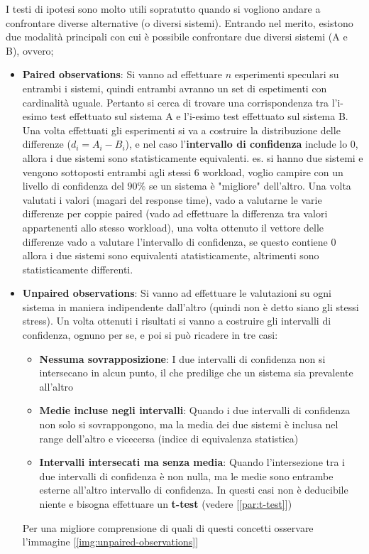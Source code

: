 I testi di ipotesi sono molto utili sopratutto quando si vogliono andare a confrontare diverse alternative (o diversi sistemi). Entrando nel merito, esistono due modalità principali con cui è possibile confrontare due diversi sistemi (A e B), ovvero;
\begin{itemize}
    \item \textbf{Paired observations}: Si vanno ad effettuare \(n\) esperimenti speculari su entrambi i sistemi, quindi entrambi avranno un set di espetimenti con cardinalità uguale. Pertanto si cerca di trovare una corrispondenza tra l'i-esimo test effettuato sul sistema A e l'i-esimo test effettuato sul sistema B.
    Una volta effettuati gli esperimenti si va a costruire la distribuzione delle differenze (\(d_i = A_i - B_i\)), e nel caso l'\textbf{intervallo di confidenza} include lo 0, allora i due sistemi sono statisticamente equivalenti.
    es. si hanno due sistemi e vengono sottoposti entrambi agli stessi 6 workload, voglio campire con un livello di confidenza del \(90\%\) se un sistema è "migliore" dell'altro. Una volta valutati i valori (magari del response time), vado a valutarne le varie differenze per coppie paired (vado ad effettuare la differenza tra valori appartenenti allo stesso workload), una volta ottenuto il vettore delle differenze vado a valutare l'intervallo di confidenza, se questo contiene 0 allora i due sistemi sono equivalenti atatisticamente, altrimenti sono statisticamente differenti.
    
    \item \textbf{Unpaired observations}: Si vanno ad effettuare le valutazioni su ogni sistema in maniera indipendente dall'altro (quindi non è detto siano gli stessi stress). Un volta ottenuti i risultati si vanno a costruire gli intervalli di confidenza, ognuno per se, e poi si può ricadere in tre casi:
    \begin{itemize}
        \item \textbf{Nessuma sovrapposizione}: I due intervalli di confidenza non si intersecano in alcun punto, il che predilige che un sistema sia prevalente all'altro
        \item \textbf{Medie incluse negli intervalli}: Quando i due intervalli di confidenza non solo si sovrappongono, ma la media dei due sistemi è inclusa nel range dell'altro e vicecersa (indice di equivalenza statistica)
        \item \textbf{Intervalli intersecati ma senza media}: Quando l'intersezione tra i due intervalli di confidenza è non nulla, ma le medie sono entrambe esterne all'altro intervallo di confidenza. In questi casi non è deducibile niente e bisogna effettuare un \textbf{t-test} (vedere [\ref{par:t-test}])
    \end{itemize}
    Per una migliore comprensione di quali di questi concetti osservare l'immagine [\ref{img:unpaired-observations}]
\end{itemize}

